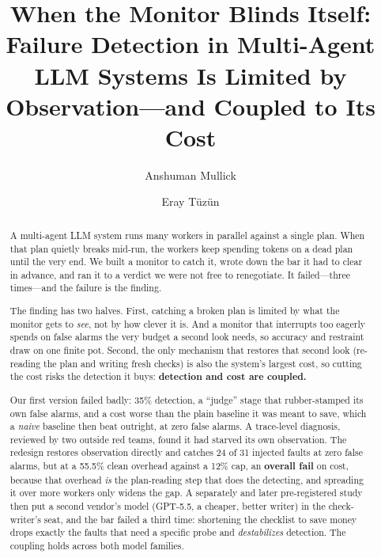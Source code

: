\documentclass[acmsmall,screen]{acmart}
\begin{document}
\title{When the Monitor Blinds Itself: Failure Detection in Multi-Agent LLM
Systems Is Limited by Observation---and Coupled to Its Cost}

\author{Anshuman Mullick}

\author{Eray T\"uz\"un}

\begin{abstract}
A multi-agent LLM system runs many workers in parallel against a single plan.
When that plan quietly breaks mid-run, the workers keep spending tokens on a dead
plan until the very end. We built a monitor to catch it, wrote down the bar it
had to clear in advance, and ran it to a verdict we were not free to renegotiate.
It failed---three times---and the failure is the finding.

The finding has two halves. First, catching a broken plan is limited by what the
monitor gets to \emph{see}, not by how clever it is. And a monitor that
interrupts too eagerly spends on false alarms the very budget a second look
needs, so accuracy and restraint draw on one finite pot. Second, the only
mechanism that restores that second look (re-reading the plan and writing fresh
checks) is also the system's largest cost, so cutting the cost risks the
detection it buys: \textbf{detection and cost are coupled.}

Our first version failed badly: 35\% detection, a ``judge'' stage that
rubber-stamped its own false alarms, and a cost worse than the plain baseline it
was meant to save, which a \emph{naive} baseline then beat outright, at zero
false alarms. A trace-level diagnosis, reviewed by two outside red teams, found it
had starved its own observation. The redesign restores observation directly and
catches 24 of 31 injected faults at zero false alarms, but at a 55.5\% clean
overhead against a 12\% cap, an \textbf{overall fail} on cost, because that
overhead \emph{is} the plan-reading step that does the detecting, and spreading it
over more workers only widens the gap. A separately and later pre-registered study
then put a second vendor's model (GPT-5.5, a cheaper, better writer) in the
check-writer's seat, and the bar failed a third time: shortening the checklist to save
money drops exactly the faults that need a specific probe and \emph{destabilizes}
detection. The coupling holds across both model families.
\end{abstract}
\end{document}
